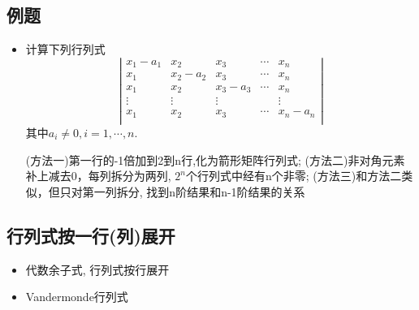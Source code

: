 \subsection*{例题}
\begin{itemize}
    \item 计算下列行列式
    \begin{equation}
    \nonumber
    \left|
        \begin{array}{ccccc}
        x_1-a_1 &x_2     &x_3     &\cdots & x_n\\
        x_1     &x_2-a_2 &x_3     &\cdots & x_n\\
        x_1     &x_2     &x_3-a_3 &\cdots & x_n\\
        \vdots  &\vdots  &\vdots  &       & \vdots\\
        x_1     &x_2     &x_3     &\cdots & x_n-a_n\\
        \end{array}
    \right|
    \end{equation} 
    其中$a_i \ne 0, i = 1,\cdots,n.$
    
    \begin{solution}
    (方法一)第一行的-1倍加到2到n行,化为箭形矩阵行列式;
    (方法二)非对角元素补上减去0，每列拆分为两列, $2^n$个行列式中经有n个非零;
    (方法三)和方法二类似，但只对第一列拆分, 找到n阶结果和n-1阶结果的关系
    \end{solution}
    \vspace{2cm}
\end{itemize}

\subsection{行列式按一行(列)展开}
\begin{itemize}
    \item 代数余子式, 行列式按行展开
    \item Vandermonde行列式 
\end{itemize}

